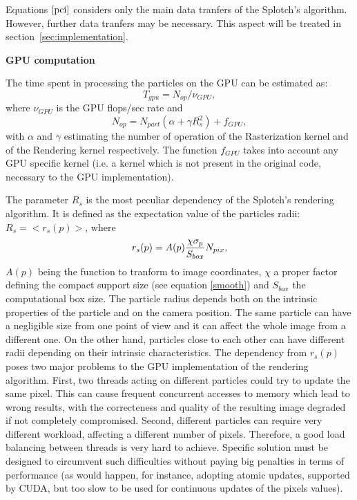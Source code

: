 \documentclass[11pt]{article}
\begin{document}
Equations $\eqref{pci}$ considers only the main data tranfers of
the Splotch's algorithm. However, further data tranfers may be necessary.
This aspect will be treated in section~\ref{sec:implementation}.

\medskip
\noindent
{\bf GPU computation}

The time spent in processing the particles on the GPU can be estimated as:
\begin{equation}
T_{gpu} = N_{op}/\nu_{GPU},
\end{equation}
where $\nu_{GPU}$ is the GPU flops/sec rate and
\begin{equation}\label{ops}
N_{op} = N_{part}(\alpha + \gamma R_s^2) + f_{GPU},
\end{equation}
with $\alpha$ and $\gamma$ estimating the number of operation of 
the Rasterization kernel  
and of the Rendering kernel respectively. The function 
$f_{GPU}$ takes into account any GPU specific kernel (i.e. a kernel
which is not present in the original code, necessary to the GPU implementation). 

The parameter $R_s$ is the most peculiar dependency of the Splotch's rendering
algorithm. It is defined as the expectation value of the particles radii:
$R_s = <r_s(p)>$, where
\begin{equation}\label{radius}
r_s(p) = A(p){\chi \sigma_p\over S_{box}} N_{pix},
\end{equation} 
$A(p)$ being the function to tranform to image coordinates,
$\chi$ a proper factor defining the compact support size (see  
equation \eqref{smooth}) and $S_{box}$ the computational box size.
The particle radius depends both on the intrinsic properties of the particle
and on the camera position. The same particle can have a negligible size
from one point of view and it can affect the whole image from a different one.
On the other hand, particles close to each other can have different radii depending
on their intrinsic characteristics. The dependency from $r_s(p)$ poses 
two major problems to the GPU implementation of the rendering 
algorithm. First, two threads acting on different particles could try 
to update the same pixel.
This can cause frequent concurrent accesses to memory
which lead to wrong results, with the correcteness and quality of the resulting image 
degraded if not completely compromised.
Second, different particles can require very different workload, affecting 
a different number of pixels. Therefore, a good load balancing
between threads is very hard to achieve.  
Specific solution must be designed to circumvent such difficulties 
without paying big penalties in terms of performance (as would happen, for instance,
adopting atomic updates, supported by CUDA, but too slow to be used for continuous 
updates of the pixels values).
\end{document}
